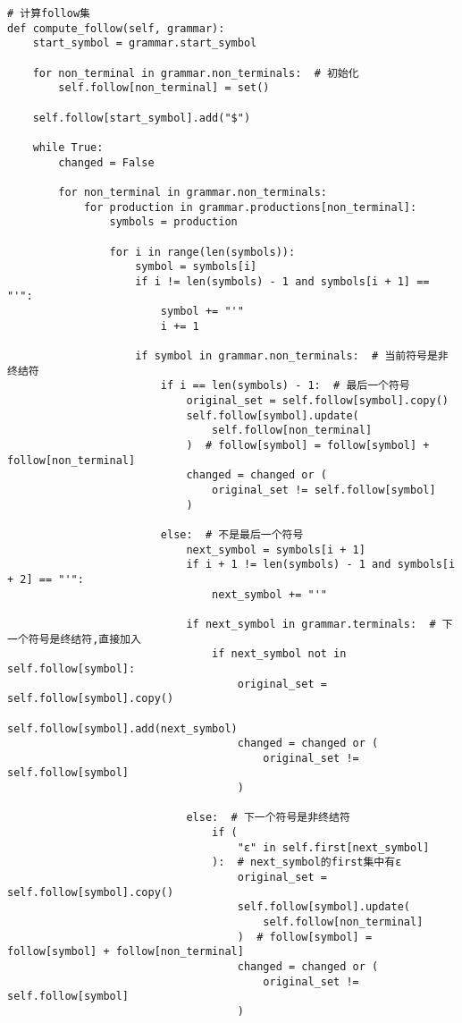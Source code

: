 \documentclass[lang=cn,11pt,a4paper]{elegantpaper}
\begin{document}
\begin{lstlisting}
# 计算follow集
def compute_follow(self, grammar):
    start_symbol = grammar.start_symbol

    for non_terminal in grammar.non_terminals:  # 初始化
        self.follow[non_terminal] = set()

    self.follow[start_symbol].add("$")

    while True:
        changed = False

        for non_terminal in grammar.non_terminals:
            for production in grammar.productions[non_terminal]:
                symbols = production

                for i in range(len(symbols)):
                    symbol = symbols[i]
                    if i != len(symbols) - 1 and symbols[i + 1] == "'":
                        symbol += "'"
                        i += 1

                    if symbol in grammar.non_terminals:  # 当前符号是非终结符
                        if i == len(symbols) - 1:  # 最后一个符号
                            original_set = self.follow[symbol].copy()
                            self.follow[symbol].update(
                                self.follow[non_terminal]
                            )  # follow[symbol] = follow[symbol] + follow[non_terminal]
                            changed = changed or (
                                original_set != self.follow[symbol]
                            )

                        else:  # 不是最后一个符号
                            next_symbol = symbols[i + 1]
                            if i + 1 != len(symbols) - 1 and symbols[i + 2] == "'":
                                next_symbol += "'"

                            if next_symbol in grammar.terminals:  # 下一个符号是终结符,直接加入
                                if next_symbol not in self.follow[symbol]:
                                    original_set = self.follow[symbol].copy()
                                    self.follow[symbol].add(next_symbol)
                                    changed = changed or (
                                        original_set != self.follow[symbol]
                                    )

                            else:  # 下一个符号是非终结符
                                if (
                                    "ε" in self.first[next_symbol]
                                ):  # next_symbol的first集中有ε
                                    original_set = self.follow[symbol].copy()
                                    self.follow[symbol].update(
                                        self.follow[non_terminal]
                                    )  # follow[symbol] = follow[symbol] + follow[non_terminal]
                                    changed = changed or (
                                        original_set != self.follow[symbol]
                                    )


\end{lstlisting}
\end{document}
